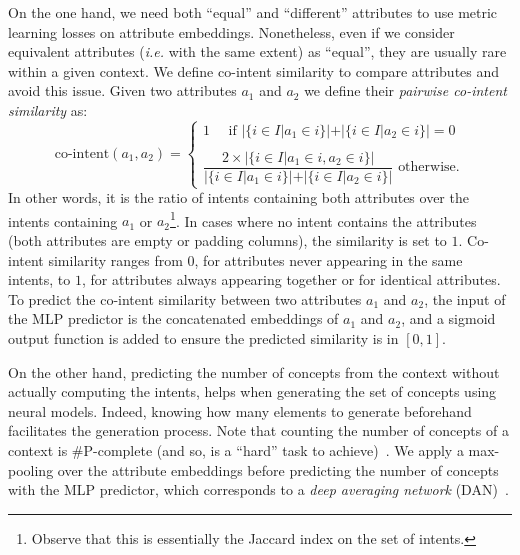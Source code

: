 On the one hand, we need both ``equal'' and ``different'' attributes to use metric learning losses on attribute embeddings.
Nonetheless, even if we consider equivalent attributes (\textit{i.e.} with the same extent) as ``equal'', they are usually rare within a given context.
We define co-intent similarity to compare attributes and avoid this issue.
Given two attributes $a_1$ and $a_2$ we define their \emph{pairwise co-intent similarity} as:
\begin{equation}
\text{co-intent}(a_1, a_2) = 
%
\left\{
    \begin{array}{l}
        1 \text{~~~ if } |\{i\in I| a_1 \in i\}| + |\{i\in I| a_2 \in i\}| = 0 \\\\
        \dfrac{2 \times |\{i\in I| a_1 \in i, a_2 \in i\}|}{|\{i\in I| a_1 \in i\}| + |\{i\in I| a_2 \in i\}|} \text{ otherwise.}
    \end{array}
\right.
\label{equ:co-intent}
\end{equation}
In other words, it is the ratio of intents containing both attributes over the intents containing $a_1$ or $a_2$\footnote{Observe that this is essentially the Jaccard index on the set of intents.}.
In cases where no intent contains the attributes (both attributes are empty or padding columns), the similarity is set to $1$.
Co-intent similarity ranges from $0$, for attributes never appearing in the same intents, to $1$, for attributes always appearing together or for identical attributes.
To predict the co-intent similarity between two attributes $a_1$ and $a_2$, the input of the MLP predictor is the concatenated embeddings of $a_1$ and $a_2$, and a sigmoid output function is added to ensure the predicted similarity is in $[0,1]$.

On the other hand, predicting the number of concepts from the context without actually computing the intents, helps when generating the set of concepts using neural models.
Indeed, knowing how many elements to generate beforehand facilitates the generation process.
Note that counting the number of concepts of a context is \#P-complete (and so, is a ``hard'' task to achieve)~\cite{lattice-size:2001:kuznetsov}.
We apply a max-pooling over the attribute embeddings before predicting the number of concepts with the MLP predictor, which corresponds to a \textit{deep averaging network} (DAN)~\cite{dan:2015:iyyer}.


